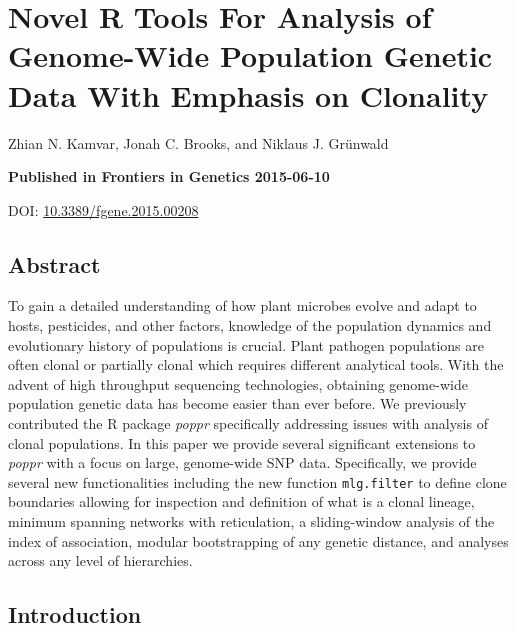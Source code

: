 \documentclass[double,12pt]{beavtex}
\begin{document}
  \chapter{Novel R Tools For Analysis of Genome-Wide Population Genetic
  Data With Emphasis on
  Clonality}\label{novel-r-tools-for-analysis-of-genome-wide-population-genetic-data-with-emphasis-on-clonality}
  
  Zhian N. Kamvar, Jonah C. Brooks, and Niklaus J. Grünwald
  
  \vspace*{\fill}
  
  \textbf{Published in Frontiers in Genetics 2015-06-10}
  
  DOI:
  \href{http://dx.doi.org/10.3389/fgene.2015.00208}{10.3389/fgene.2015.00208}
  
  \newpage
  
  \section{Abstract}\label{abstract-2}
  
  To gain a detailed understanding of how plant microbes evolve and adapt
  to hosts, pesticides, and other factors, knowledge of the population
  dynamics and evolutionary history of populations is crucial. Plant
  pathogen populations are often clonal or partially clonal which requires
  different analytical tools. With the advent of high throughput
  sequencing technologies, obtaining genome-wide population genetic data
  has become easier than ever before. We previously contributed the R
  package \emph{poppr} specifically addressing issues with analysis of
  clonal populations. In this paper we provide several significant
  extensions to \emph{poppr} with a focus on large, genome-wide SNP data.
  Specifically, we provide several new functionalities including the new
  function \texttt{mlg.filter} to define clone boundaries allowing for
  inspection and definition of what is a clonal lineage, minimum spanning
  networks with reticulation, a sliding-window analysis of the index of
  association, modular bootstrapping of any genetic distance, and analyses
  across any level of hierarchies.
  
  \section{Introduction}\label{introduction-2}
  
\end{document}
